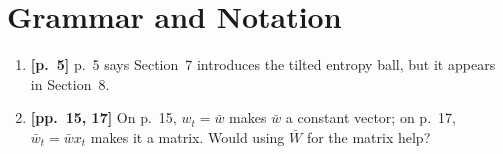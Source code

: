 \documentclass[11pt]{article}
\begin{document}
\section{Grammar and Notation}

\begin{enumerate}[label=\textbf{G\arabic*.}, leftmargin=*, itemsep=6pt, listparindent=1em]

\item \textbf{[p.~5]}
p.~5 says Section~7 introduces the tilted entropy ball, but it appears in Section~8.

\item \textbf{[pp.~15, 17]}
On p.~15, $w_t = \bar w$ makes $\bar w$ a constant vector; on p.~17, $\bar w_t = \bar w x_t$ makes it a matrix. Would using $\bar W$ for the matrix help?

\end{enumerate}
\end{document}
